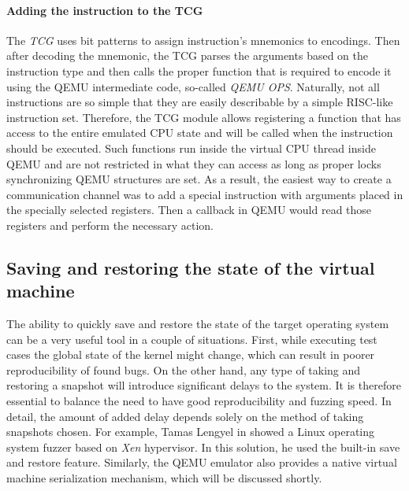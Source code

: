 \paragraph{Adding the instruction to the TCG}
The \textit{TCG} uses bit patterns to assign instruction's mnemonics to encodings. Then after decoding the mnemonic, the TCG parses the arguments based on the instruction type and then calls the proper function that is required to encode it using the QEMU intermediate code, so-called \textit{QEMU OPS}. Naturally, not all instructions are so simple that they are easily describable by a simple RISC-like instruction set. Therefore, the TCG module allows registering a function that has access to the entire emulated CPU state and will be called when the instruction should be executed. Such functions run inside the virtual CPU thread inside QEMU and are not restricted in what they can access as long as proper locks synchronizing QEMU structures are set. As a result, the easiest way to create a communication channel was to add a special instruction with arguments placed in the specially selected registers. Then a callback in QEMU would read those registers and perform the necessary action.

\subsection{Saving and restoring the state of the virtual machine} \label{sec:savevm}
The ability to quickly save and restore the state of the target operating system can be a very useful tool in a couple of situations. First, while executing test cases the global state of the kernel might change, which can result in poorer reproducibility of found bugs. On the other hand, any type of taking and restoring a snapshot will introduce significant delays to the system. It is therefore essential to balance the need to have good reproducibility and fuzzing speed. In detail, the amount of added delay depends solely on the method of taking snapshots chosen. For example, Tamas Lengyel in \cite{xenfuzz} showed a Linux operating system fuzzer based on \textit{Xen} hypervisor. In this solution, he used the built-in save and restore feature. Similarly, the QEMU emulator also provides a native virtual machine serialization mechanism, which will be discussed shortly.

